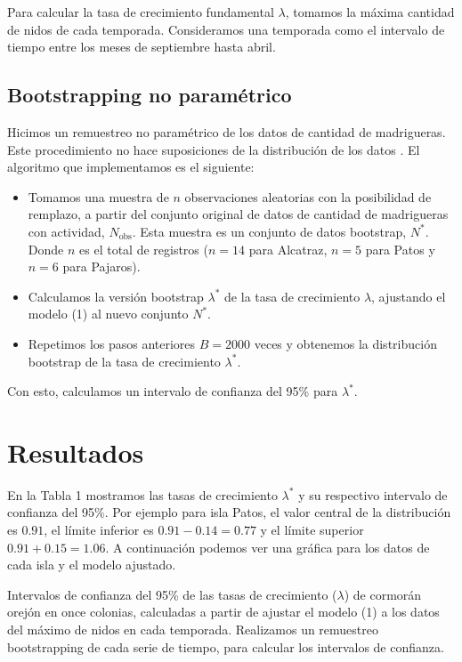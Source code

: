 \documentclass{article} %
\begin{document}
Para calcular la tasa de crecimiento fundamental $\lambda$, tomamos la máxima cantidad de nidos de cada temporada. Consideramos una temporada como el intervalo de tiempo entre los meses de septiembre hasta abril.

\subsection*{Bootstrapping no paramétrico}

Hicimos un remuestreo no paramétrico de los datos de cantidad de madrigueras. Este procedimiento no hace suposiciones de la distribución de los datos \cite{carpenter2000bootstrap}. El algoritmo que implementamos es el siguiente: 

\begin{itemize}
    \item Tomamos una muestra de $n$ observaciones aleatorias con la posibilidad de remplazo, a partir del conjunto original de datos de cantidad de madrigueras con actividad, $ N_{\mbox{obs}} $. Esta muestra es un conjunto de datos bootstrap, $N^{*}$. Donde $n$ es el total de registros ($n=14$ para Alcatraz, $n=5$ para Patos y $n=6$ para Pajaros).
    \item Calculamos la versión bootstrap $\lambda^*$ de la tasa de crecimiento $\lambda$, ajustando el modelo (1) al nuevo conjunto $N^{*}$.
    \item Repetimos los pasos anteriores $B = 2000$ veces y obtenemos la distribución bootstrap de la tasa de crecimiento $\lambda^*$.
\end{itemize}

Con esto, calculamos un intervalo de confianza del 95\% para $ \lambda^* $. 

\section*{Resultados}

En la Tabla 1 mostramos las tasas de crecimiento $\lambda^*$ y su respectivo intervalo de confianza del 95\%. Por ejemplo para isla Patos, el valor central de la distribución es $0.91$, el límite inferior es $0.91 - 0.14 = 0.77$ y el límite superior $ 0.91 + 0.15 = 1.06$. A continuación podemos ver una gráfica para los datos de cada isla y el modelo ajustado.

\begin{table}[H]
\centering
\caption{Intervalos de confianza del 95\% de las tasas de crecimiento ($\lambda$) de cormorán orejón en once colonias, calculadas a partir de ajustar el modelo (1) a los datos del máximo de nidos en cada temporada. Realizamos un remuestreo bootstrapping de cada serie de tiempo, para calcular los intervalos de confianza.}
\label{tab:csvTodasLambdas}
\end{table}
\end{document}

